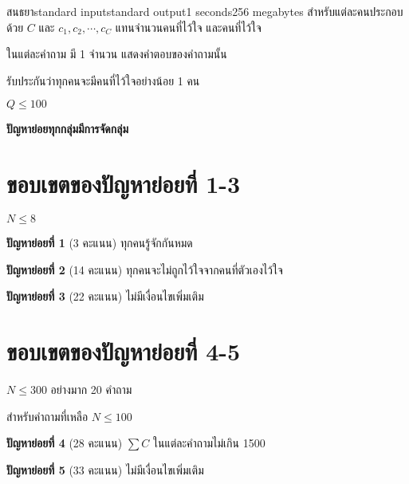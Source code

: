 \documentclass[11pt,a4paper]{article}
\begin{document}
\begin{problem}{สนธยา}{standard input}{standard output}{1 seconds}{256 megabytes}
สำหรับแต่ละคนประกอบด้วย $C$ และ $c_1, c_2, \cdots, c_C$ แทนจำนวนคนที่ไว้ใจ และคนที่ไว้ใจ

\OutputFile

ในแต่ละคำถาม มี 1 จำนวน แสดงคำตอบของคำถามนั้น

\Constraints

รับประกันว่าทุกคนจะมีคนที่ไว้ใจอย่างน้อย 1 คน

$Q \le 100$

\Subtasks

\textbf{ปัญหาย่อยทุกกลุ่มมีการจัดกลุ่ม}

\section*{ขอบเขตของปัญหาย่อยที่ 1-3}

$N \le 8$

\textbf{ปัญหาย่อยที่ 1} (3 คะแนน) ทุกคนรู้จักกันหมด

\textbf{ปัญหาย่อยที่ 2} (14 คะแนน) ทุกคนจะไม่ถูกไว้ใจจากคนที่ตัวเองไว้ใจ

\textbf{ปัญหาย่อยที่ 3} (22 คะแนน) ไม่มีเงื่อนไขเพิ่มเติม

\section*{ขอบเขตของปัญหาย่อยที่ 4-5}

$N \le 300$ อย่างมาก 20 คำถาม

สำหรับคำถามที่เหลือ $N \le 100$

\textbf{ปัญหาย่อยที่ 4} (28 คะแนน) $\sum{C}$ ในแต่ละคำถามไม่เกิน 1500

\textbf{ปัญหาย่อยที่ 5} (33 คะแนน) ไม่มีเงื่อนไขเพิ่มเติม

\Examples

\begin{example}
%
\end{example}

\end{problem}
\end{document}
